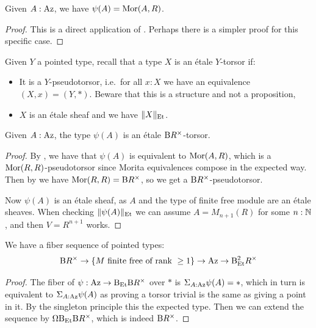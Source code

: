 \begin{lemma}\label{psi-equivalent-mor}
Given $A:{\mathrm{Az}}$, we have $\psi(A) = {\mathrm{Mor}}(A,R)$.
\end{lemma}

\begin{proof}
This is a direct application of . Perhaps there is a simpler proof for this specific case.
\end{proof}

Given $Y$ a pointed type, recall that a type $X$ is an \'etale $Y$-torsor if:
\begin{itemize}
\item It is a $Y$-pseudotorsor, i.e.\ for all $x:X$ we have an equivalence $(X,x) = (Y,*)$. Beware that this is a structure and not a proposition,
\item $X$ is an \'etale sheaf and we have $\lVert X \rVert_{{\mathrm{Et}}}$.
\end{itemize}

\begin{corollary}
Given $A:{\mathrm{Az}}$, the type $\psi(A)$ is an \'etale $\mathrm{B} R^\times$-torsor.
\end{corollary}

\begin{proof}
By , we have that $\psi(A)$ is equivalent to ${\mathrm{Mor}}(A,R)$, which is a ${\mathrm{Mor}}(R,R)$-pseudotorsor since Morita equivalences compose in the expected way. Then by  we have ${\mathrm{Mor}}(R,R) = \mathrm{B} R^\times$, so we get a $\mathrm{B} R^\times$-pseudotorsor. 

Now $\psi(A)$ is an \'etale sheaf, as $A$ and the type of finite free module are an \'etale sheaves. When checking $\lVert \psi(A) \rVert_{{\mathrm{Et}}}$ we can assume $A=M_{n+1}(R)$ for some $n:\mathbb{N}$, and then $V=R^{n+1}$ works.
\end{proof}

\begin{corollary}
We have a fiber sequence of pointed types:
\[\B R^\times \to \{M\ \text{finite\ free\ of\ rank}\ \geq 1\} \to \Az\to \B_{\Et}^2 R^\times\]
\end{corollary}

\begin{proof}
The fiber of $\psi:{\mathrm{Az}}\to \mathrm{B}_{{\mathrm{Et}}}\mathrm{B} R^\times$ over $*$ is $\Sigma_{A:{\mathrm{Az}}}\psi(A)=*$, which in turn is equivalent to $\Sigma_{A:{\mathrm{Az}}}\psi(A)$ as proving a torsor trivial is the same as giving a point in it.  By the singleton principle this the expected type. Then we can extend the sequence by $\Omega \mathrm{B}_{{\mathrm{Et}}}\mathrm{B} R^\times$, which is indeed $\mathrm{B} R^\times$.
\end{proof}

